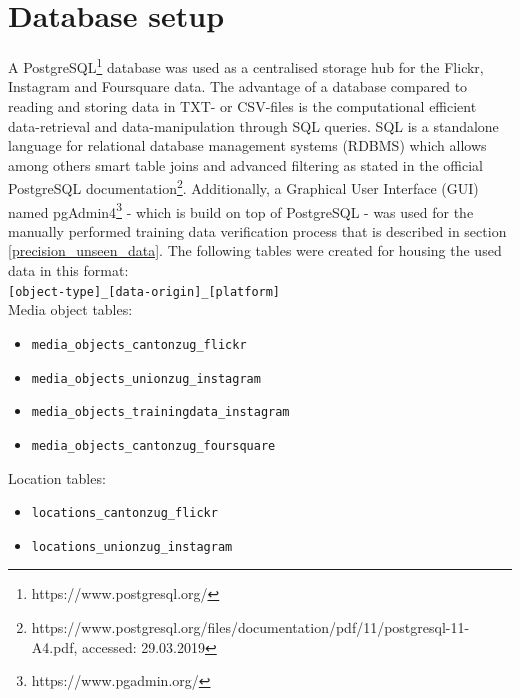 \section{Database setup} \label{database_setup}
A PostgreSQL\footnote{https://www.postgresql.org/} database was used as a centralised storage hub for the Flickr, Instagram and Foursquare data. The advantage of a database compared to reading and storing data in TXT- or CSV-files is the computational efficient data-retrieval and data-manipulation through SQL queries. SQL is a standalone language for relational database management systems (RDBMS) which allows among others smart table joins and advanced filtering as stated in the official PostgreSQL documentation\footnote{https://www.postgresql.org/files/documentation/pdf/11/postgresql-11-A4.pdf, accessed: 29.03.2019}. Additionally, a Graphical User Interface (GUI) named pgAdmin4\footnote{https://www.pgadmin.org/} - which is build on top of PostgreSQL - was used for the manually performed training data verification process that is described in section \ref{precision_unseen_data}. The following tables were created for housing the used data in this format:\\ \texttt{[object-type]\_[data-origin]\_[platform]} \\

Media object tables:

\begin{itemize}
    \item \texttt{media\_objects\_cantonzug\_flickr}
    \item \texttt{media\_objects\_unionzug\_instagram}
    \item \texttt{media\_objects\_trainingdata\_instagram}
    \item \texttt{media\_objects\_cantonzug\_foursquare}
\end{itemize}

Location tables:

\begin{itemize}
    \item \texttt{locations\_cantonzug\_flickr}
    \item \texttt{locations\_unionzug\_instagram}
\end{itemize}

